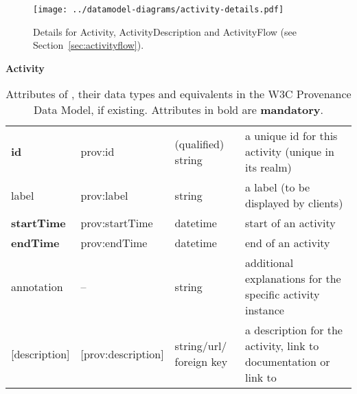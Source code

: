 \begin{figure}[h]
\centering
\texttt{[image: ../datamodel-diagrams/activity-details.pdf]}
\caption{Details for Activity, ActivityDescription and ActivityFlow (see Section~\ref{sec:activityflow}). 
}
\label{fig:activity-details}
\end{figure}



\begin{table}[h]

\small
{}\textwidth

\textbf{\normalsize Activity}\vspace{0.25em}\\
\begin{tabulary}{1.0\textwidth}{@{}lp{2.5cm}p{2cm}L@{}}
\toprule
{} &  &  & \\
\midrule
\textbf{id} & prov:id  & (qualified) string & a unique id for this activity (unique in its realm)\\
label        & prov:label  & string & a label (to be displayed by clients)\\
\textbf{startTime} & prov:startTime & datetime & start of an activity\\
\textbf{endTime} & prov:endTime  & datetime & end of an activity\\
annotation        & --  & string & additional explanations for the specific activity instance\\
{[description]}  & [prov:description] & string/url/ foreign key & a description for the activity, 
                link to documentation or link to \\
\bottomrule
\end{tabulary}
\caption{Attributes of , their data types and equivalents in the W3C Provenance 
Data Model, if existing. Attributes in bold are \textbf{mandatory}.}
\end{table}



